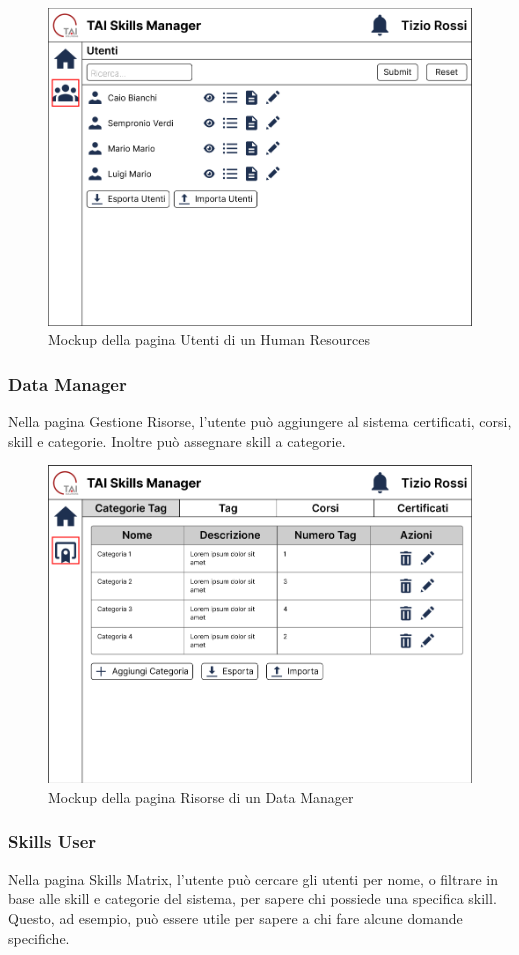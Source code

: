 \begin{figure}[ht!]  
    \centering
        \includegraphics[width=0.7\linewidth]{immagini/mockup/Pagina Utenti HR.png}
        \caption{Mockup della pagina Utenti di un Human Resources}
        \label{mockup-utenti}
\end{figure}
\FloatBarrier

\subsubsection{Data Manager}
Nella pagina Gestione Risorse, l’utente può aggiungere al sistema certificati, corsi, skill e categorie. Inoltre può assegnare skill a categorie.

\begin{figure}[ht!]  
    \centering
        \includegraphics[width=0.7\linewidth]{immagini/mockup/Pagina Risorse Data Manager.png}
        \caption{Mockup della pagina Risorse di un Data Manager}
        \label{mockup-risorse}
\end{figure}
\FloatBarrier

\subsubsection{Skills User}
Nella pagina Skills Matrix, l’utente può cercare gli utenti per nome, o filtrare in base alle skill e categorie del sistema, per sapere chi possiede una specifica skill. Questo, ad esempio, può essere utile per sapere a chi fare alcune domande specifiche.

